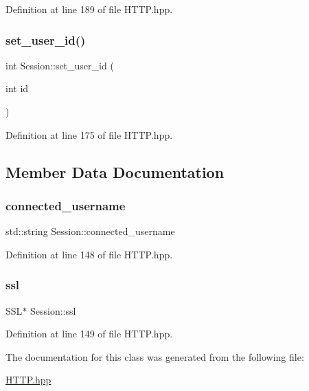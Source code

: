 Definition at line 189 of file H\+T\+T\+P.\+hpp.

\mbox{\label{class_session_a53ebfd01b312282657f5072ee4b354ce}} 
\subsubsection{\texorpdfstring{set\+\_\+user\+\_\+id()}{set\_user\_id()}}
{\footnotesize\ttfamily int Session\+::set\+\_\+user\+\_\+id (\begin{DoxyParamCaption}\item[{int}]{id }\end{DoxyParamCaption})}



Definition at line 175 of file H\+T\+T\+P.\+hpp.



\subsection{Member Data Documentation}
\mbox{\label{class_session_a2a2b3e2d7b9a83aed8ec95a1cf780ce0}} 
\subsubsection{\texorpdfstring{connected\+\_\+username}{connected\_username}}
{\footnotesize\ttfamily std\+::string Session\+::connected\+\_\+username}



Definition at line 148 of file H\+T\+T\+P.\+hpp.

\mbox{\label{class_session_aa10aed26ea7c02319c118af55076295e}} 
\subsubsection{\texorpdfstring{ssl}{ssl}}
{\footnotesize\ttfamily S\+SL$\ast$ Session\+::ssl}



Definition at line 149 of file H\+T\+T\+P.\+hpp.



The documentation for this class was generated from the following file\+:\begin{DoxyCompactItemize}
\item 
\hyperlink{_h_t_t_p_8hpp}{H\+T\+T\+P.\+hpp}\end{DoxyCompactItemize}

